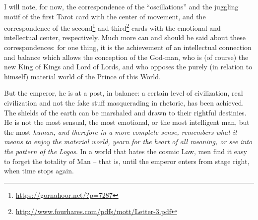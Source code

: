 I will note, for now, the correspondence of the ``oscillations'' and the juggling motif of the first Tarot card with the center of movement, and the correspondence of the second\footnote{\url{https://gornahoor.net/?p=7287}} and third\footnote{\url{http://www.fourhares.com/pdfs/mott/Letter-3.pdf}} cards with the emotional and intellectual center, respectively. Much more can and should be said about these correspondences: for one thing, it is the achievement of an intellectual connection and balance which allows the conception of the God-man, who is (of course) the new King of Kings and Lord of Lords, and who opposes the purely (in relation to himself) material world of the Prince of this World.

But the emperor, he is at a post, in balance: a certain level of civilization, real civilization and not the fake stuff masquerading in rhetoric, has been achieved. The shields of the earth can be marshaled and drawn to their rightful destinies. He is not the most sensual, the most emotional, or the most intelligent man, but the most \emph{human, and therefore in a more complete sense, remembers what it means to enjoy the material world, yearn for the heart of all meaning, or see into the pattern of the Logos}. In a world that hates the cosmic Law, men find it easy to forget the totality of Man -- that is, until the emperor enters from stage right, when time stops again.



